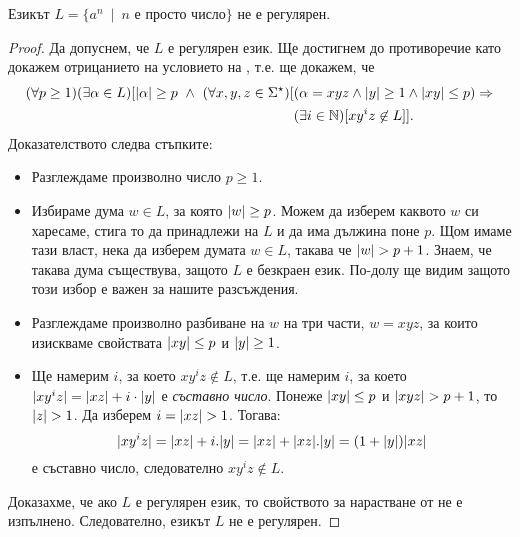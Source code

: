 \begin{example}
  Езикът $L = \{a^n\ \mid\ n\mbox{ е просто число}\}$ не е регулярен.
\end{example}
\begin{proof}
  Да допуснем, че $L$ е регулярен език. Ще достигнем до противоречие като докажем отрицанието на условието на ,
  т.е. ще докажем, че
  \begin{align*}
    (\forall p \geq 1)(\exists \alpha \in L)[\abs{\alpha} \geq p\ \wedge\ (\forall x,y,z\in\Sigma^\star)[ & (\alpha = xyz \wedge \abs{y} \geq 1\wedge \abs{xy} \leq p) \Rightarrow\\
    & (\exists i\in\Nat)[xy^iz \not\in L]].
  \end{align*}
  Доказателството следва стъпките:
  \begin{itemize}
  \item 
    Разглеждаме произволно число $p \geq 1$.
  \item
    Избираме дума $w \in L$, за която $\lvert{w}\rvert \geq p$. Можем да изберем каквото $w$ 
    си харесаме, стига то да принадлежи на $L$ и да има дължина поне $p$.
    Щом имаме тази власт, нека да изберем думата $w \in L$, такава че $\lvert{w}\rvert > p+1$.
    Знаем, че такава дума съществува, защото $L$ е безкраен език. По-долу ще видим защото този избор е важен за нашите разсъждения.
  \item
    Разглеждаме произволно разбиване на $w$ на три части, $w = xyz$,
    за които изискваме свойствата $\lvert{xy}\rvert \leq p$ и $\lvert{y}\rvert \geq 1$.
  \item
    Ще намерим $i$, за което $xy^iz \not\in L$,
    т.е. ще намерим $i$, за което 
    $\lvert{xy^iz}\rvert = \lvert{xz}\rvert + i\cdot\lvert{y}\rvert$ е {\em съставно число}.
    Понеже $\lvert{xy}\rvert \leq p$ и $\lvert{xyz}\rvert > p+1$, то $\lvert{z}\rvert > 1$.
    Да изберем $i = \lvert{xz}\rvert > 1$. Тогава:
    \[\lvert{xy^iz}\rvert = \lvert{xz}\rvert + i.\lvert{y}\rvert = \lvert{xz}\rvert + \lvert{xz}\rvert.\lvert{y}\rvert = (1 + \lvert{y}\rvert)\lvert{xz}\rvert\] е съставно число, следователно 
    $xy^iz \not\in L$.
  \end{itemize}
  Доказахме, че ако $L$ е регулярен език, то свойството за нарастване от  не е изпълнено. Следователно, езикът $L$
  не е регулярен.  
\end{proof}

